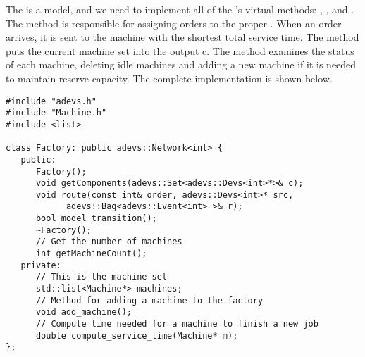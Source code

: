 The  is a  model, and we need to implement all of the 's virtual methods: , , and . The  method is responsible for assigning orders to the proper . When an order arrives, it is sent to the machine with the shortest total service time. The  method puts the current machine set into the output  c. The  method examines the status of each machine, deleting idle machines and adding a new machine if it is needed to maintain reserve capacity. The complete  implementation is shown below.
\begin{verbatim}
#include "adevs.h"
#include "Machine.h"
#include <list>

class Factory: public adevs::Network<int> {
   public:
      Factory();
      void getComponents(adevs::Set<adevs::Devs<int>*>& c);
      void route(const int& order, adevs::Devs<int>* src,
            adevs::Bag<adevs::Event<int> >& r);
      bool model_transition();
      ~Factory();
      // Get the number of machines
      int getMachineCount();
   private:
      // This is the machine set
      std::list<Machine*> machines;
      // Method for adding a machine to the factory
      void add_machine();
      // Compute time needed for a machine to finish a new job
      double compute_service_time(Machine* m);
};
\end{verbatim}
